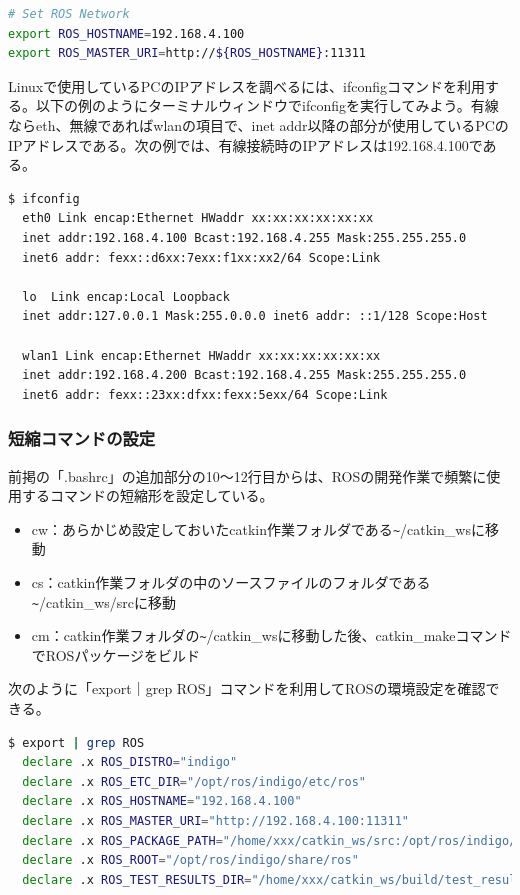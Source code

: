 \begin{lstlisting}[language=bash]
# Set ROS Network
export ROS_HOSTNAME=192.168.4.100
export ROS_MASTER_URI=http://${ROS_HOSTNAME}:11311
\end{lstlisting}

\begin{exercise}[ifconfig]
  Linuxで使用しているPCのIPアドレスを調べるには、ifconfigコマンドを利用する。以下の例のようにターミナルウィンドウでifconfigを実行してみよう。有線ならeth、無線であればwlanの項目で、inet addr以降の部分が使用しているPCのIPアドレスである。次の例では、有線接続時のIPアドレスは192.168.4.100である。
  \begin{lstlisting}[language=ROS, backgroundcolor=\color{ocre!10}, numbers=none]
  $ ifconfig
  eth0 Link encap:Ethernet HWaddr xx:xx:xx:xx:xx:xx
  inet addr:192.168.4.100 Bcast:192.168.4.255 Mask:255.255.255.0
  inet6 addr: fexx::d6xx:7exx:f1xx:xx2/64 Scope:Link

  lo  Link encap:Local Loopback
  inet addr:127.0.0.1 Mask:255.0.0.0 inet6 addr: ::1/128 Scope:Host

  wlan1 Link encap:Ethernet HWaddr xx:xx:xx:xx:xx:xx
  inet addr:192.168.4.200 Bcast:192.168.4.255 Mask:255.255.255.0
  inet6 addr: fexx::23xx:dfxx:fexx:5exx/64 Scope:Link
  \end{lstlisting}
\end{exercise}

\subsubsection{短縮コマンドの設定}

前掲の「.bashrc」の追加部分の10～12行目からは、ROSの開発作業で頻繁に使用するコマンドの短縮形を設定している。

\begin{itemize}[leftmargin=*]
\item cw：あらかじめ設定しておいたcatkin作業フォルダである\verb|~|/catkin\_wsに移動
\item cs：catkin作業フォルダの中のソースファイルのフォルダである\verb|~|/catkin\_ws/srcに移動
\item cm：catkin作業フォルダの\verb|~|/catkin\_wsに移動した後、catkin\_makeコマンドでROSパッケージをビルド
\end{itemize}

\begin{exercise}[ROSの環境設定を確認する方法]
  次のように「export｜grep ROS」コマンドを利用してROSの環境設定を確認できる。

  \begin{lstlisting}[language=bash]
  $ export | grep ROS
  declare .x ROS_DISTRO="indigo"
  declare .x ROS_ETC_DIR="/opt/ros/indigo/etc/ros"
  declare .x ROS_HOSTNAME="192.168.4.100"
  declare .x ROS_MASTER_URI="http://192.168.4.100:11311"
  declare .x ROS_PACKAGE_PATH="/home/xxx/catkin_ws/src:/opt/ros/indigo/share:/opt/ros/indigo/ stacks"
  declare .x ROS_ROOT="/opt/ros/indigo/share/ros"
  declare .x ROS_TEST_RESULTS_DIR="/home/xxx/catkin_ws/build/test_results"
  \end{lstlisting}
\end{exercise}


